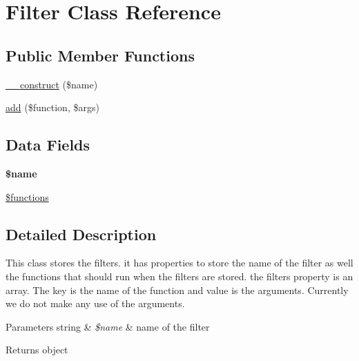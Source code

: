 \hypertarget{class_filter}{\section{Filter Class Reference}
\label{class_filter}
}
\subsection*{Public Member Functions}
\begin{DoxyCompactItemize}
\item 
\hyperlink{class_filter_a4717bbfc70a40a57ee741ed70766c309}{\-\_\-\-\_\-construct} (\$name)
\item 
\hyperlink{class_filter_a90cbfdb2d91157a1f2e94fcab3d220b3}{add} (\$function, \$args)
\end{DoxyCompactItemize}
\subsection*{Data Fields}
\begin{DoxyCompactItemize}
\item 
\hypertarget{class_filter_ab2fc40d43824ea3e1ce5d86dee0d763b}{{\bfseries \$name}}\label{class_filter_ab2fc40d43824ea3e1ce5d86dee0d763b}

\item 
\hyperlink{class_filter_aa75daea491817f3b64daa2f51128bcdf}{\$functions}
\end{DoxyCompactItemize}


\subsection{Detailed Description}
This class stores the filters. it has properties to store the name of the filter as well the functions that should run when the filters are stored. the filters property is an array. The key is the name of the function and value is the arguments. Currently we do not make any use of the arguments.


\begin{DoxyParams}[1]{Parameters}
string & {\em \$name} & name of the filter \\
\hline
\end{DoxyParams}
\begin{DoxyReturn}{Returns}
object 
\end{DoxyReturn}


